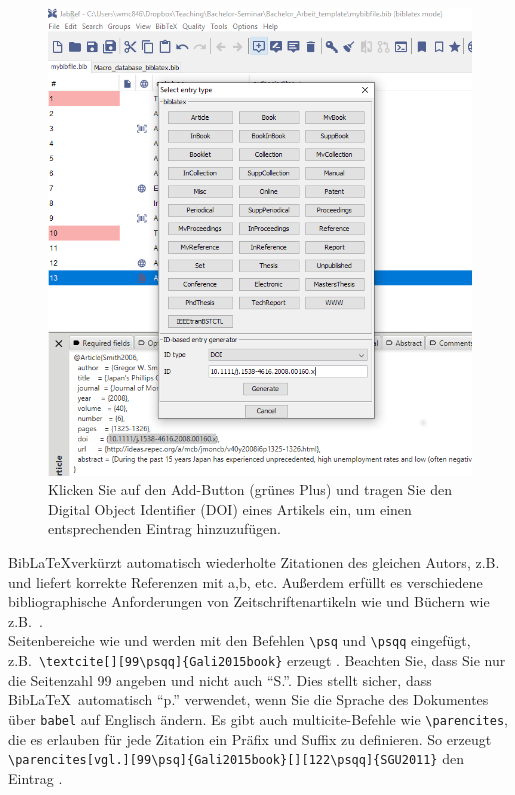 \documentclass[a4paper,12pt]{scrartcl} %
\makeatletter
\def\ScaleIfNeeded{%
\ifdim\Gin@nat@width>\linewidth
\linewidth
\else
\Gin@nat@width
\fi
}
\makeatother
\begin{document}
\begin{figure}[t]
\includegraphics[width=\ScaleIfNeeded]{JabrefDOI}
\caption[Nutzung von DOIs in JabRef]{Klicken Sie auf den Add-Button (grünes Plus) und tragen Sie den Digital Object Identifier (DOI) eines Artikels ein, um einen entsprechenden Eintrag hinzuzufügen.}\label{fig:jabref_doi}
\end{figure}
Bib\LaTeX verkürzt automatisch wiederholte Zitationen des gleichen Autors, z.B.\ \parencite{SGU2004JET,SGU2004,SGU2009,SGU2011} und liefert korrekte Referenzen mit a,b, etc. Außerdem erfüllt es verschiedene bibliographische Anforderungen von Zeitschriftenartikeln wie \textcite{SGU2004} und Büchern wie z.B.\ \textcite{SGU2005}.\\
Seitenbereiche wie \textcite[][99\psq]{Gali2015book} und \textcite[][99\psqq]{Gali2015book} werden mit den Befehlen \texttt{\textbackslash psq} und \texttt{\textbackslash psqq} eingefügt, z.B.\ \texttt{\textbackslash textcite[][99\textbackslash psqq]\{Gali2015book\}} erzeugt \textcite[][99\psqq]{Gali2015book}. Beachten Sie, dass Sie nur die Seitenzahl 99 angeben und nicht auch ``S.''. Dies stellt sicher, dass Bib\LaTeX\ automatisch ``p.'' verwendet, wenn Sie die Sprache des Dokumentes über \texttt{babel} auf Englisch ändern.
Es gibt auch multicite-Befehle wie \verb|\parencites|, die es erlauben für jede Zitation ein Präfix und Suffix zu definieren. So erzeugt \verb|\parencites[vgl.][99\psq]{Gali2015book}[][122\psqq]{SGU2011}| den Eintrag \parencites[vgl.][99\psq]{Gali2015book}[][122\psqq]{SGU2011}.
\end{document}
